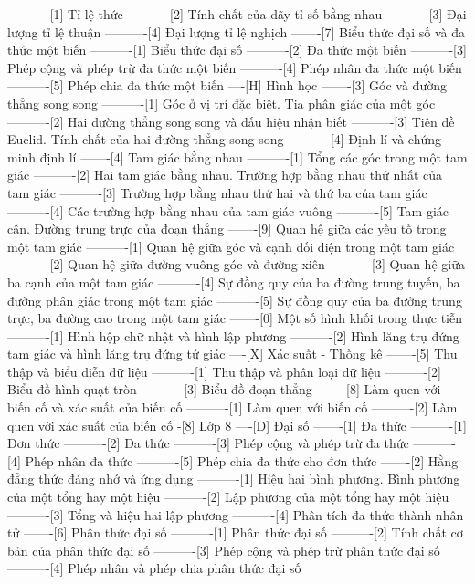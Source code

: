 ----------[1] Tỉ lệ thức
----------[2] Tính chất của dãy tỉ số bằng nhau
----------[3] Đại lượng tỉ lệ thuận
----------[4] Đại lượng tỉ lệ nghịch
-------[7] Biểu thức đại số và đa thức một biến
----------[1] Biểu thức đại số
----------[2] Đa thức một biến
----------[3] Phép cộng và phép trừ đa thức một biến
----------[4] Phép nhân đa thức một biến
----------[5] Phép chia đa thức một biến
----[H] Hình học
-------[3] Góc và đường thẳng song song
----------[1] Góc ở vị trí đặc biệt. Tia phân giác của một góc
----------[2] Hai đường thẳng song song và dấu hiệu nhận biết
----------[3] Tiên đề Euclid. Tính chất của hai đường thẳng song song
----------[4] Định lí và chứng minh định lí
-------[4] Tam giác bằng nhau
----------[1] Tổng các góc trong một tam giác
----------[2] Hai tam giác bằng nhau. Trường hợp bằng nhau thứ nhất của tam giác
----------[3] Trường hợp bằng nhau thứ hai và thứ ba của tam giác
----------[4] Các trường hợp bằng nhau của tam giác vuông
----------[5] Tam giác cân. Đường trung trực của đoạn thẳng
-------[9] Quan hệ giữa các yếu tố trong một tam giác
----------[1] Quan hệ giữa góc và cạnh đối diện trong một tam giác
----------[2] Quan hệ giữa đường vuông góc và đường xiên
----------[3] Quan hệ giữa ba cạnh của một tam giác
----------[4] Sự đồng quy của ba đường trung tuyến, ba đường phân giác trong một tam giác
----------[5] Sự đồng quy của ba đường trung trực, ba đường cao trong một tam giác
-------[0] Một số hình khối trong thực tiễn
----------[1] Hình hộp chữ nhật và hình lập phương
----------[2] Hình lăng trụ đứng tam giác và hình lăng trụ đứng tứ giác
----[X] Xác suất - Thống kê
-------[5] Thu thập và biểu diễn dữ liệu
----------[1] Thu thập và phân loại dữ liệu
----------[2] Biểu đồ hình quạt tròn
----------[3] Biểu đồ đoạn thẳng
-------[8] Làm quen với biến cố và xác suất của biến cố
----------[1] Làm quen với biến cố
----------[2] Làm quen với xác suất của biến cố
-[8] Lớp 8
----[D] Đại số
-------[1] Đa thức
----------[1] Đơn thức
----------[2] Đa thức
----------[3] Phép cộng và phép trừ đa thức
----------[4] Phép nhân đa thức
----------[5] Phép chia đa thức cho đơn thức
-------[2] Hằng đẳng thức đáng nhớ và ứng dụng
----------[1] Hiệu hai bình phương. Bình phương của một tổng hay một hiệu
----------[2] Lập phương của một tổng hay một hiệu
----------[3] Tổng và hiệu hai lập phương
----------[4] Phân tích đa thức thành nhân tử
-------[6] Phân thức đại số
----------[1] Phân thức đại số
----------[2] Tính chất cơ bản của phân thức đại số
----------[3] Phép cộng và phép trừ phân thức đại số
----------[4] Phép nhân và phép chia phân thức đại số
